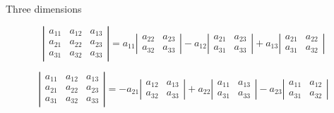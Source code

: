 \documentclass{beamer}
\begin{document}
\begin{frame}{Three dimensions}
  \begin{example}
    \begin{equation*}
      \left|
        \begin{array}{ccc}
          a_{11}&a_{12}&a_{13}\\
          a_{21}&a_{22}&a_{23}\\
          a_{31}&a_{32}&a_{33}
        \end{array}
      \right|=
      a_{11}\left|
	\begin{array}{cc}
          a_{22}&a_{23}\\
          a_{32}&a_{33}
	\end{array}
      \right|-a_{12} \left|
	\begin{array}{cc}
          a_{21}&a_{23}\\
          a_{31}&a_{33}
	\end{array}
      \right|+a_{13} \left|
	\begin{array}{cc}
          a_{21}&a_{22}\\
          a_{31}&a_{32}
	\end{array}
      \right|
    \end{equation*}
  \end{example}
   \begin{example}
    \begin{equation*}
      \left|
        \begin{array}{ccc}
          a_{11}&a_{12}&a_{13}\\
          a_{21}&a_{22}&a_{23}\\
          a_{31}&a_{32}&a_{33}
        \end{array}
      \right|=
      -a_{21}\left|
	\begin{array}{cc}
          a_{12}&a_{13}\\
          a_{32}&a_{33}
	\end{array}
      \right|+a_{22} \left|
	\begin{array}{cc}
          a_{11}&a_{13}\\
          a_{31}&a_{33}
	\end{array}
      \right|-a_{23} \left|
	\begin{array}{cc}
          a_{11}&a_{12}\\
          a_{31}&a_{32}
	\end{array}
      \right|
    \end{equation*}
  \end{example}
\end{frame}
\end{document}
